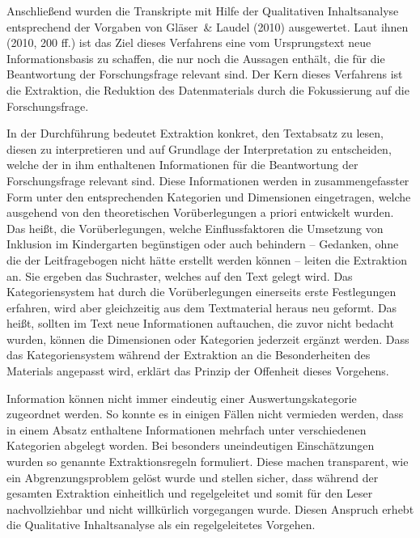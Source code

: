 Anschließend wurden die Transkripte mit Hilfe der Qualitativen Inhaltsanalyse entsprechend der Vorgaben von Gläser~\& Laudel (2010) ausgewertet. Laut ihnen (2010, 200 ff.) ist das Ziel dieses Verfahrens eine vom Ursprungstext neue Informationsbasis zu schaffen, die nur noch die Aussagen enthält, die für die Beantwortung der Forschungsfrage relevant sind. Der Kern dieses Verfahrens ist die Extraktion, die Reduktion des Datenmaterials durch die Fokussierung auf die Forschungsfrage.  

In der Durchführung bedeutet Extraktion konkret, den Textabsatz zu lesen, diesen zu interpretieren und auf Grundlage der Interpretation zu entscheiden, welche der in ihm enthaltenen Informationen für die Beantwortung der Forschungsfrage relevant sind. Diese Informationen werden in zusammengefasster Form unter den entsprechenden Kategorien und Dimensionen eingetragen, welche ausgehend von den theoretischen Vorüberlegungen a priori entwickelt wurden. Das heißt, die Vorüberlegungen, welche Einflussfaktoren die Umsetzung von Inklusion im Kindergarten begünstigen oder auch behindern -- Gedanken, ohne die der Leitfragebogen nicht hätte erstellt werden können -- leiten die Extraktion an. Sie ergeben das Suchraster, welches auf den Text gelegt wird. Das Kategoriensystem hat durch die Vorüberlegungen einerseits erste Festlegungen erfahren, wird aber gleichzeitig aus dem Textmaterial heraus neu geformt. Das heißt, sollten im Text neue Informationen auftauchen, die zuvor nicht bedacht wurden, können die Dimensionen oder Kategorien jederzeit ergänzt werden. Dass das Kategoriensystem während der Extraktion an die Besonderheiten des Materials angepasst wird, erklärt das Prinzip der Offenheit dieses Vorgehens. 

Information können nicht immer eindeutig einer Auswertungskategorie zugeordnet werden. So konnte es in einigen Fällen nicht vermieden werden, dass in einem Absatz enthaltene Informationen mehrfach unter verschiedenen Kategorien abgelegt worden. Bei besonders uneindeutigen Einschätzungen wurden so genannte Extraktionsregeln formuliert. Diese machen transparent, wie ein Abgrenzungsproblem gelöst wurde und stellen sicher, dass während der gesamten Extraktion einheitlich und regelgeleitet und somit für den Leser nachvollziehbar und nicht willkürlich vorgegangen wurde. Diesen Anspruch erhebt die Qualitative Inhaltsanalyse als ein regelgeleitetes Vorgehen. 

